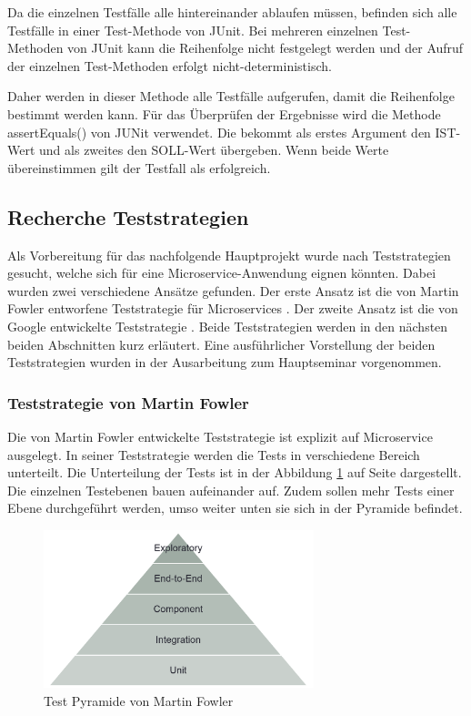 \documentclass{llncs}
\begin{document}
Da die einzelnen Testfälle alle hintereinander ablaufen müssen, befinden sich alle Testfälle in einer Test-Methode von JUnit. Bei mehreren einzelnen Test-Methoden von JUnit kann die Reihenfolge nicht festgelegt werden und der Aufruf der einzelnen Test-Methoden erfolgt nicht-deterministisch.

Daher werden in dieser Methode alle Testfälle aufgerufen, damit die Reihenfolge bestimmt werden kann. Für das Überprüfen der Ergebnisse wird die Methode assertEquals() von JUNit verwendet. Die bekommt als erstes Argument den IST-Wert und als zweites den SOLL-Wert übergeben. Wenn beide Werte übereinstimmen gilt der Testfall als erfolgreich.

\subsection{Recherche Teststrategien}
Als Vorbereitung für das nachfolgende Hauptprojekt wurde nach Teststrategien gesucht, welche sich für eine Microservice-Anwendung eignen könnten. Dabei wurden zwei verschiedene Ansätze gefunden. Der erste Ansatz ist die von Martin Fowler entworfene Teststrategie für Microservices \cite{Fowler2014testing}. Der zweite Ansatz ist die von Google entwickelte Teststrategie \cite{whittaker2012google}. Beide Teststrategien werden in den nächsten beiden Abschnitten kurz erläutert. Eine ausführlicher Vorstellung der beiden Teststrategien wurden in der Ausarbeitung zum Hauptseminar vorgenommen.

\subsubsection{Teststrategie von Martin Fowler}
Die von Martin Fowler entwickelte Teststrategie ist explizit auf Microservice ausgelegt. In seiner Teststrategie werden die Tests in verschiedene Bereich unterteilt. Die Unterteilung der Tests ist in der Abbildung \ref{fig:PyramideFowler} auf Seite \pageref{fig:PyramideFowler} dargestellt. Die einzelnen Testebenen bauen aufeinander auf. Zudem sollen mehr Tests einer Ebene durchgeführt werden, umso weiter unten sie sich in der Pyramide befindet. 

\begin{figure}[htbp]
  \centering
      \includegraphics[width=0.7\textwidth]{./Images/FowlerPyramide.PNG}
    \caption{Test Pyramide von Martin Fowler}
    \label{fig:PyramideFowler}
\end{figure}
\end{document}
